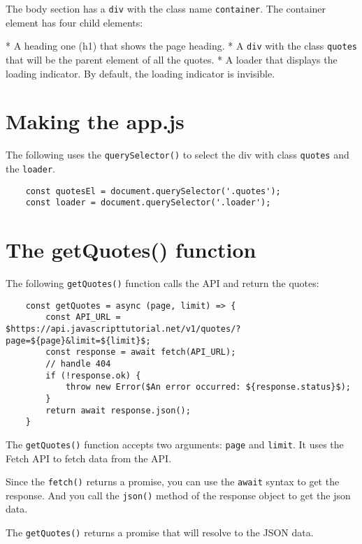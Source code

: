 \documentclass[11pt]{article}
\begin{document}
\noindent
The body section has a \verb|div| with the class name \verb|container|.
The container element has four child elements:

* A heading one (h1) that shows the page heading.
* A \verb|div| with the class \verb|quotes| that will be the parent element of
all the quotes.
* A loader that displays the loading indicator. By default,
the loading indicator is invisible.

\section*{Making the app.js}

The following uses the \verb|querySelector()| to select the div with
class \verb|quotes| and the \verb|loader|.

\begin{lstlisting}
    const quotesEl = document.querySelector('.quotes');
    const loader = document.querySelector('.loader');
\end{lstlisting}

\section*{The getQuotes() function}

The following \verb|getQuotes()| function calls the API and return the quotes:

\begin{lstlisting}
    const getQuotes = async (page, limit) => {
        const API_URL = $https://api.javascripttutorial.net/v1/quotes/?page=${page}&limit=${limit}$;
        const response = await fetch(API_URL);
        // handle 404
        if (!response.ok) {
            throw new Error($An error occurred: ${response.status}$);
        }
        return await response.json();
    }
\end{lstlisting}

\noindent
The \verb|getQuotes()| function accepts two arguments: \verb|page| and \verb|limit|.
It uses the Fetch API to fetch data from the API.
\newline

\noindent
Since the \verb|fetch()| returns a promise, you can use the \verb|await| syntax
to get the response. And you call the \verb|json()| method of the response
object to get the json data.
\newline

\noindent
The \verb|getQuotes()| returns a promise that will resolve to the JSON data.
\newline
\end{document}
